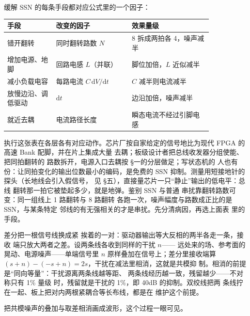 缓解 SSN 的每条手段都对应公式里的一个因子：

\begin{longtable}{L{0.2\linewidth}L{0.31\linewidth}L{0.33\linewidth}}
\toprule
手段 & 改变的因子 & 效果量级 \\
\midrule
错开翻转 & 同时翻转路数 $N$ & 8 拆成两拍各 4，噪声减半 \\
增加电源、地脚 & 回路电感 $L$（并联） & 脚位加倍，$L$ 近似减半 \\
减小负载电容 & 每路电流 $C\,\mathrm{d}V/\mathrm{d}t$ & $C$ 减半则电流减半 \\
放慢边沿、调低驱动 & $\mathrm{d}t$ & 边沿加倍，噪声减半 \\
就近去耦 & 电流路径长度 & 瞬态电流不经过引脚电感 \\
\bottomrule
\end{longtable}

执行这张表在各层各有对应动作。芯片厂按自家给定的信号地比为现代 FPGA 的高速 Bank 配脚，并在片上集成大量
去耦；板级设计者把总线收发器分组使能、把同拍翻转的
路数拆开，电源入口去耦按 §一的分层做足；写状态机的
人也有份：让同拍变化的输出位数最小的编码，是免费的
SSN 抑制。测量用短接地针的探头（长地线会引入假信号，
见 §五），直接量芯片一只“静止”输出的低电平：总线
翻转那一拍它被垫起多少，就是地弹。鉴别 SSN 与普通
串扰靠翻转路数可变：同一组线上 1 路翻转与 8 路翻转
各跑一次，噪声幅度与路数成正比的是 SSN，与某条特定
邻线的有无强相关的才是串扰。先分清病因，再选上面表
里的手段。

差分把一根信号线换成紧
挨着的一对：驱动器输出等大反相的两半各走一条，接收
端只放大两者之差。设两条线各收到同样的干扰 $n$——
远处来的场、参考面的晃动、电源噪声——单端信号里
$n$ 原样叠加在信号上；差分里接收端算
$(s+n)-(-s+n)=2s$，干扰在减法里相消，这就是共模抑
制。相消的前提是“同向等量”：干扰源离两条线越等距、
两条线经历越一致，残留越少——不对称只有 1\% 量级
时，残留就是干扰的 1\%，即 40dB 的抑制。双绞线把两
条线拧在一起、板上把对内两根紧耦合等长布线，都是在
维护这个前提。

把共模噪声的叠加与取差相消画成波形，这个过程一眼可见。

